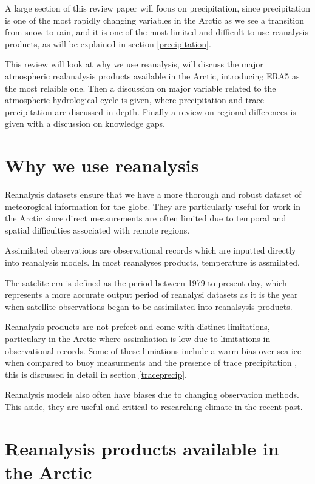 \documentclass[11pt, oneside]{article}
\begin{document}
A large section of this review paper will focus on precipitation, since precipitation is one of the most rapidly changing variables in the Arctic as we see a transition from snow to rain, and it is one of the most limited and difficult to use reanalysis products, as will be explained in section \ref{precipitation}.

This review will look at why we use reanalysis, will discuss the major atmospheric realanalysis products available in the Arctic, introducing ERA5 as the most relaible one. Then a discussion on major variable related to the atmospheric hydrological cycle is given, where precipitation and trace precipitation are discussed in depth. Finally a review on regional differences is given with a discussion on knowledge gaps. 


\section{Why we use reanalysis}
Reanalysis datasets ensure that we have a more thorough and robust dataset of meteorogical information for the globe. They are particularly useful for work in the Arctic since direct measurements are often limited due to temporal and spatial difficulties associated with remote regions.

Assimilated observations are observational records which are inputted directly into reanalysis models. In most reanalyses products, temperature is assmilated. 

The satelite era is defined as the period between 1979 to present day, which represents a more accurate output period of reanalysi datasets as it is the year when satellite observations began to be assimilated into reanalsysis products. 


Reanalysis products are not prefect and come with distinct limitations, particulary in the Arctic where assimliation is low due to limitations in observational records. Some of these limiations include a warm bias over sea ice when compared to buoy measurments \cite{wang2019comparison} and the presence of trace precipitation \cite{boisvert2018intercomparison}, this is discussed in detail in section \ref{traceprecip}.

Reanalysis models also often have biases due to changing observation methods. This aside, they are useful and critical to researching climate in the recent past. 

\section{Reanalysis products available in the Arctic}
\end{document}
